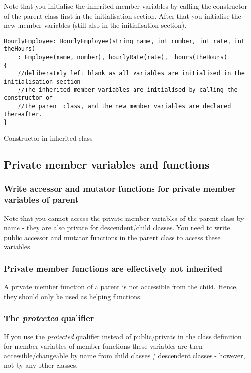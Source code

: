 Note that you initialise the inherited member variables by calling the constructor of 
the parent class first in the initialisation section. After that you initialise the new member 
variables (still also in the initialisation section).

\begin{listing}[H]
\begin{verbatim}
HourlyEmployee::HourlyEmployee(string name, int number, int rate, int theHours)
	: Employee(name, number), hourlyRate(rate),  hours(theHours)
{
	//deliberately left blank as all variables are initialised in the initialisation section
	//The inherited member variables are initialised by calling the constructor of
	//the parent class, and the new member variables are declared thereafter.
}
\end{verbatim}
\caption{Constructor in inherited class}
\label{source_code_1}
\end{listing}





\subsection{Private member variables and functions }

\subsubsection*{Write accessor and mutator functions for private member variables of parent}
Note that you cannot access the private member variables of the parent class by
name - they are also private for descendent/child classes. You need to write public
accessor and mutator functions in the parent class to access these variables.

\subsubsection*{Private member functions are effectively not inherited}
A private member function of a parent is not accessible from the child. Hence, they
should only be used as helping functions.

\subsubsection*{The \emph{protected} qualifier}
If you use the \emph{protected} qualifier instead of public/private in the class definition
for member variables of member functions these variables are then accessible/changeable
by name from child classes / descendent classes - however, not by any other classes.

